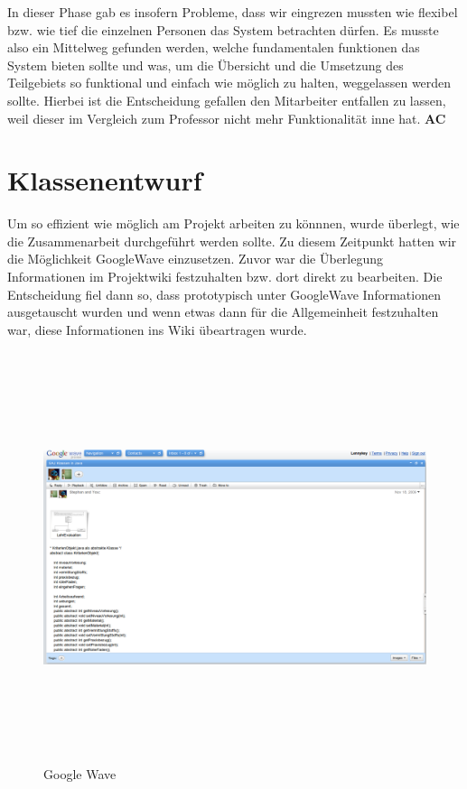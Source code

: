 \documentclass[titlepage, 12pt,a4paper]{scrartcl}
\begin{document}
In dieser Phase gab es insofern Probleme, dass wir eingrezen mussten wie
flexibel bzw. wie tief die einzelnen Personen das System betrachten dürfen. Es
musste also ein Mittelweg gefunden werden, welche fundamentalen funktionen das
System bieten sollte und was, um die Übersicht und die Umsetzung des
Teilgebiets so funktional und einfach wie möglich zu halten, weggelassen werden
sollte. Hierbei ist die Entscheidung gefallen den Mitarbeiter entfallen zu
lassen, weil dieser im Vergleich zum Professor nicht mehr Funktionalität inne
hat. 
{\bf{AC}}
\section{Klassenentwurf}
Um so effizient wie möglich am Projekt arbeiten zu könnnen, wurde überlegt, wie
die Zusammenarbeit durchgeführt werden sollte. Zu diesem Zeitpunkt hatten
wir die Möglichkeit GoogleWave einzusetzen. Zuvor war die Überlegung
Informationen im Projektwiki festzuhalten bzw. dort direkt zu bearbeiten. Die
Entscheidung fiel dann so, dass prototypisch unter GoogleWave Informationen
ausgetauscht wurden und wenn etwas dann für die Allgemeinheit festzuhalten war,
diese Informationen ins Wiki übeartragen wurde. 

\begin{figure}[h]
\begin{center}
\includegraphics[width=15cm, height=12cm]{bilder/googleWave.png}
\caption{Google Wave}
\label{googleWave}
\end{center}
\end{figure}
\end{document}
